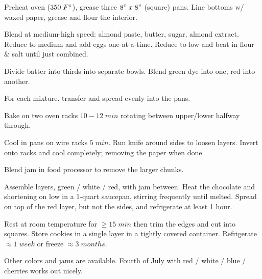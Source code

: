 \begin{preparation}
\item Preheat oven ($350\; F^\circ$), grease three $8"\;x\;8"$ (square) pans.
Line bottoms w/ waxed paper, grease and flour the interior.

\item Blend at medium-high speed: almond paste, butter, sugar, almond extract.
Reduce to medium and add eggs one-at-a-time.
Reduce to low and beat in flour \& salt until just combined.

\item Divide batter into thirds into separate bowls.
Blend green dye into one, red into another.

\item For each mixture. transfer and spread evenly into the pans.

\item Bake on two oven racks $10-12\; min$ rotating between upper/lower halfway through.

\item Cool in pans on wire racks $5\; min$.
Run knife around sides to loosen layers. Invert onto racks and cool completely; removing the paper when done.

\item Blend jam in food processor to remove the larger chunks.

\item Assemble layers, green / white / red, with jam between.
Heat the chocolate and shortening on low in a 1-quart saucepan, stirring frequently until melted.
Spread on top of the red layer, but not the sides, and refrigerate at least 1 hour.

\item Rest at room temperature for $\geq 15\; min$ then trim the edges and cut into squares.
Store cookies in a single layer in a tightly covered container.
Refrigerate $\approx 1\; week$ or freeze $\approx 3\; months$.
\end{preparation}

\begin{variation}
\item Other colors and jams are available. Fourth of July with red / white / blue / cherries works out nicely.
\end{variation}